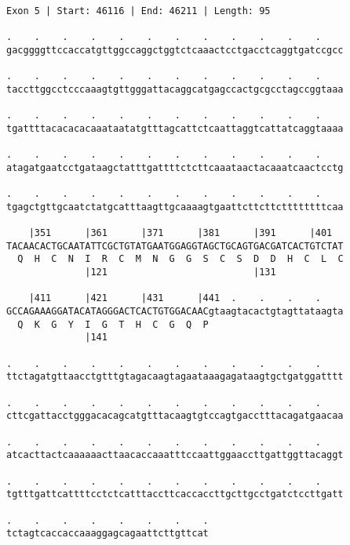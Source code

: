 \documentclass{article}
\begin{document}
\begin{Verbatim}
Exon 5 | Start: 46116 | End: 46211 | Length: 95
 
.    .    .    .    .    .    .    .    .    .    .    .    
gacggggttccaccatgttggccaggctggtctcaaactcctgacctcaggtgatccgcc
  
.    .    .    .    .    .    .    .    .    .    .    .    
taccttggcctcccaaagtgttgggattacaggcatgagccactgcgcctagccggtaaa
  
.    .    .    .    .    .    .    .    .    .    .    .    
tgattttacacacacaaataatatgtttagcattctcaattaggtcattatcaggtaaaa
  
.    .    .    .    .    .    .    .    .    .    .    .    
atagatgaatcctgataagctatttgattttctcttcaaataactacaaatcaactcctg
  
.    .    .    .    .    .    .    .    .    .    .    .    
tgagctgttgcaatctatgcatttaagttgcaaaagtgaattcttcttcttttttttcaa
  
    |351      |361      |371      |381      |391      |401  
TACAACACTGCAATATTCGCTGTATGAATGGAGGTAGCTGCAGTGACGATCACTGTCTAT
  Q  H  C  N  I  R  C  M  N  G  G  S  C  S  D  D  H  C  L  C
              |121                          |131            
  
    |411      |421      |431      |441  .    .    .    .    
GCCAGAAAGGATACATAGGGACTCACTGTGGACAACgtaagtacactgtagttataagta
  Q  K  G  Y  I  G  T  H  C  G  Q  P                        
              |141                                          
  
.    .    .    .    .    .    .    .    .    .    .    .    
ttctagatgttaacctgtttgtagacaagtagaataaagagataagtgctgatggatttt
  
.    .    .    .    .    .    .    .    .    .    .    .    
cttcgattacctgggacacagcatgtttacaagtgtccagtgacctttacagatgaacaa
  
.    .    .    .    .    .    .    .    .    .    .    .    
atcacttactcaaaaaacttaacaccaaatttccaattggaaccttgattggttacaggt
  
.    .    .    .    .    .    .    .    .    .    .    .    
tgtttgattcattttcctctcatttaccttcaccaccttgcttgcctgatctccttgatt
  
.    .    .    .    .    .    .    .
tctagtcaccaccaaaggagcagaattcttgttcat
\end{Verbatim}
\newpage
\end{document}
